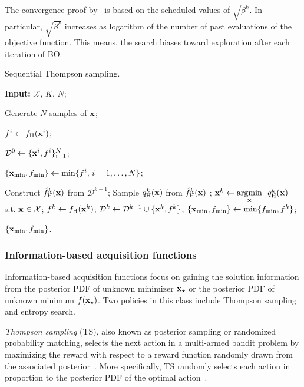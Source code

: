 \documentclass[journal ]{new-aiaa}
\begin{document}
	The convergence proof by~\citet{Srinivas2010} is based on the scheduled values of $\sqrt{\beta^k}$.
	In particular, $\sqrt{\beta^k}$ increases as logarithm of the number of past evaluations of the objective function.
	This means, the search biases toward exploration after each iteration of BO.
	
	\begin{algorithm}
		\caption{Sequential Thompson sampling.}\label{Algo2}
		\begin{algorithmic}[1]
			\State \textbf{Input:} $\mathcal{X}$, $K$, $N$;
			
			\State Generate $N$ samples of ${\bf x}$;
			
			\State $f^i \gets f_\text{H}({\bf x}^i)$; \textcolor{black}{}
			\EndFor
			
			\State $\mathcal{D}^0 \gets \{{\bf x}^i,f^i\}_{i=1}^N$;
			
			\State $\{{\bf x}_{\min},f_{\min}\} \gets \min\{f^i,\, i=1,\dots, N\}$;
			
			\State Construct $\hat{f}_\text{H}^k({\bf x})$ from $\mathcal{D}^{k-1}$;
			\State Sample $q_\text{H}^k({\bf x})$ from $\hat{f}_\text{H}^k({\bf x})$ \label{Algo2:10}; 
			\State ${\bf x}^{k} \gets \underset{{\bf x}}{\mathrm{argmin}} \ \ q_\text{H}^k({\bf x})$ s.t. ${\bf x} \in \mathcal{X}$;
			\State $f^{k} \gets f_\text{H}({\bf x}^{k})$;
			\textcolor{black}{}
			\State $\mathcal{D}^k\gets\mathcal{D}^{k-1} \cup \{{\bf x}^{k},f^{k}\}$;
			\State $\{{\bf x}_{\min},f_{\min}\} \gets \min\{f_{\min},f^{k}\}$;
			\EndFor
			
			\State \Return $\{{\bf x}_{\min},f_{\min}\}$.
		\end{algorithmic}
	\end{algorithm}
	
	\subsubsection{Information-based acquisition functions}\label{Sec513}
	
	Information-based acquisition functions focus on gaining the solution information from the posterior PDF of unknown minimizer ${\bf x}_\star$ or the posterior PDF of unknown minimum $f({\bf x}_\star)$.
	Two policies in this class include Thompson sampling and entropy search.
	
	\textit{Thompson sampling} (TS), also known as posterior sampling or randomized probability matching, selects the next action in a multi-armed bandit problem by maximizing the reward with respect to a reward function randomly drawn from the associated posterior~\citep[see e.g.,][]{Chapelle2011,Agrawal2012,Bijl2016}.
	More specifically, TS randomly selects each action in proportion to the posterior PDF of the optimal action~\citep{Scott2010}.
	
\end{document}
